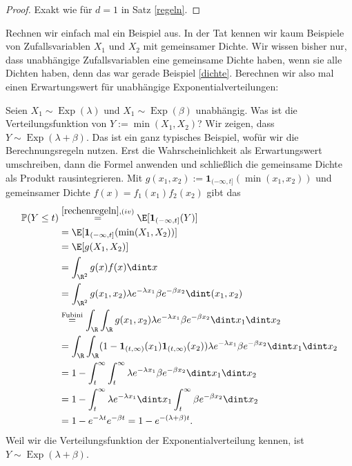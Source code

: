 \begin{proof}
	Exakt wie für $d=1$ in Satz \ref{regeln}.
\end{proof}
Rechnen wir einfach mal ein Beispiel aus. In der Tat kennen wir kaum Beispiele von Zufallsvariablen $X_1$ und $X_2$ mit gemeinsamer Dichte. Wir wissen bisher nur, dass unabh\"angige Zufallsvariablen eine gemeinsame Dichte haben, wenn sie alle Dichten haben, denn das war gerade Beispiel \ref{dichte}. Berechnen wir also mal einen Erwartungswert f\"ur unabh\"angige Exponentialverteilungen:
\begin{beispiel}
	Seien $X_1 \sim \operatorname{Exp}(\lambda)$ und $X_1 \sim \operatorname{Exp}(\beta)$ unabhängig. Was ist die Verteilungsfunktion von $ Y := \min(X_1,X_2)$? Wir zeigen, dass $Y \sim \operatorname{Exp}(\lambda + \beta)$. Das ist ein ganz typisches Beispiel, wof\"ur wir die Berechnungsregeln nutzen. Erst die Wahrscheinlichkeit als Erwartungswert umschreiben, dann die Formel anwenden und schlie\ss lich die gemeinsame Dichte als Produkt rausintegrieren. Mit $g(x_1,x_2) := \mathbf{1}_{(-\infty,t]}(\min(x_1,x_2))$ und gemeinsamer Dichte $f(x)=f_1(x_1)f_2(x_2)$ gibt das
	\begin{align*}
		\mathbb{P}(Y \leq t) & \overset{\ref{rechenregeln}, (iv)}{=} \E[\mathbf{1}_{(-\infty,t]}(Y)] \\
		&= \E[\mathbf{1}_{(-\infty,t]}(\min(X_1,X_2))] \\
		&= \E[g(X_1,X_2)] \\
		&=\int_{\R^2} g(x)f(x)\dint x\\
		&= \int_{\R^2} g(x_1,x_2) \lambda e^{-\lambda x_1} \beta e^{-\beta x_2} \dint (x_1,x_2)\\
		&\overset{\text{Fubini}}{=} \int_{\R} \int_{\R} g(x_1,x_2) \lambda e^{-\lambda x_1} \beta e^{-\beta x_2} \dint x_1 \dint x_2 \\
		&= \int_{\R} \int_{\R} (1 - \mathbf{1}_{(t,\infty)}(x_1)\mathbf{1}_{(t,\infty)}(x_2)) \lambda e^{-\lambda x_1} \beta e^{-\beta x_2} \dint x_1 \dint x_2\\
		&= 1 - \int_{t}^{\infty} \int_{t}^{\infty} \lambda e^{-\lambda x_1} \beta e^{-\beta x_2} \dint x_1 \dint x_2 \\
		&= 1 - \int_{t}^{\infty} \lambda e^{-\lambda x_1} \dint x_1 \int_{t}^{\infty} \beta e^{-\beta x_2} \dint x_2\\
		& = 1 - e^{-\lambda t} e^{-\beta t} = 1 - e^{-(\lambda + \beta)t}.
	\end{align*}
	Weil wir die Verteilungsfunktion der Exponentialverteilung kennen, ist  $Y\sim \operatorname{Exp}(\lambda+\beta)$.
\end{beispiel}

